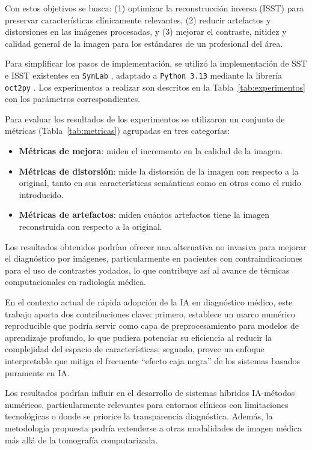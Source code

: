 Con estos objetivos se busca: (1) optimizar la reconstrucción inversa (ISST) para preservar características clínicamente relevantes, (2) reducir artefactos y distorsiones en las imágenes procesadas, y (3) mejorar el contraste, nitidez y calidad general de la imagen para los estándares de un profesional del área.

Para simplificar los pasos de implementación, se utilizó la implementación de SST e ISST existentes en \texttt{SynLab} \cite{SynchrosqueezedCurveletTransform,SynchrosqueezedCurveletTransform_SynLab}, adaptado a \texttt{Python 3.13} mediante la librería \texttt{oct2py} \cite{oct2py}. Los experimentos a realizar son descritos en la Tabla~\ref{tab:experimentos} con los parámetros correspondientes.

Para evaluar los resultados de los experimentos se utilizaron un conjunto de métricas (Tabla~\ref{tab:metricas}) agrupadas en tres categorías:

\begin{itemize}
    \item \textbf{Métricas de mejora}: miden el incremento en la calidad de la imagen.
    \item \textbf{Métricas de distorsión}: mide la distorsión de la imagen con respecto a la original, tanto en sus características semánticas como en otras como el ruido introducido.
    \item \textbf{Métricas de artefactos}: miden cuántos artefactos tiene la imagen reconstruida con respecto a la original.
\end{itemize}

Los resultados obtenidos podrían ofrecer una alternativa no invasiva para mejorar el diagnóstico por imágenes, particularmente en pacientes con contraindicaciones para el uso de contrastes yodados, lo que contribuye así al avance de técnicas computacionales en radiología médica.

En el contexto actual de rápida adopción de la IA en diagnóstico médico, este trabajo aporta dos contribuciones clave: primero, establece un marco numérico reproducible que podría servir como capa de preprocesamiento para modelos de aprendizaje profundo, lo que pudiera potenciar su eficiencia al reducir la complejidad del espacio de características; segundo, provee un enfoque interpretable que mitiga el frecuente ``efecto caja negra'' de los sistemas basados puramente en IA.

Los resultados podrían influir en el desarrollo de sistemas híbridos IA-métodos numéricos, particularmente relevantes para entornos clínicos con limitaciones tecnológicas o donde se priorice la transparencia diagnóstica. Además, la metodología propuesta podría extenderse a otras modalidades de imagen médica más allá de la tomografía computarizada.

